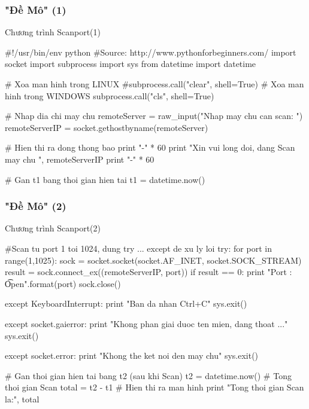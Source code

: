 \documentclass[10pt]{beamer}
\newcommand\sFontvi{\fontsize{8}{7.2}\selectfont} %
\begin{document}
\label{Chu y tai lieu commnet 3}
\begin{frame}[fragile] \label{Demo - phan 1}
\frametitle{"Đề Mô" (1)}
\begin{block}{Chương trình Scanport(1)}\label{Chuong trinh scan port phan 1}
\sFontvi
\begin{python}
#!/usr/bin/env python
#Source: http://www.pythonforbeginners.com/
import socket
import subprocess
import sys
from datetime import datetime

# Xoa man hinh trong LINUX
#subprocess.call("clear", shell=True)
# Xoa man hinh trong WINDOWS
subprocess.call("cls", shell=True)

# Nhap dia chi may chu
remoteServer    = raw_input("Nhap may chu can scan: ")
remoteServerIP  = socket.gethostbyname(remoteServer)

# Hien thi ra dong thong bao
print "-" * 60
print "Xin vui long doi, dang Scan may chu ", remoteServerIP
print "-" * 60

# Gan t1 bang thoi gian hien tai
t1 = datetime.now()
\end{python}
\end{block}
\end{frame}
\begin{frame}[fragile]\label{Demo - phan 2}
\frametitle{"Đề Mô" (2)}
\begin{block}{Chương trình Scanport(2)}\label{Chuong trinh scan port phan 2}
\sFontvi
\begin{python}
#Scan tu port 1 toi 1024, dung try ... except de xu ly loi
try:
    for port in range(1,1025):  
        sock = socket.socket(socket.AF_INET, socket.SOCK_STREAM)
        result = sock.connect_ex((remoteServerIP, port))
        if result == 0:
            print "Port {}: \t Open".format(port)
        sock.close()

except KeyboardInterrupt:
    print "Ban da nhan Ctrl+C"
    sys.exit()

except socket.gaierror:
    print "Khong phan giai duoc ten mien, dang thoat ..."
    sys.exit()

except socket.error:
    print "Khong the ket noi den may chu"
    sys.exit()

# Gan thoi gian hien tai bang t2 (sau khi Scan)
t2 = datetime.now()
# Tong thoi gian Scan
total =  t2 - t1
# Hien thi ra man hinh
print "Tong thoi gian Scan la:", total
\end{python}
\end{block}
\end{frame}
\end{document}
